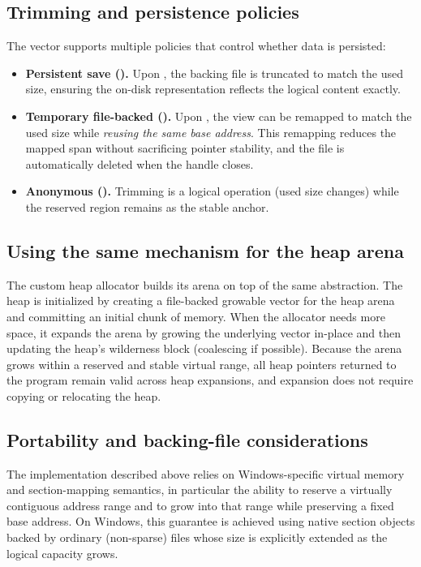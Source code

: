 \subsection{Trimming and persistence policies}
\label{sec:trim_persist}

The vector supports multiple policies that control whether data is persisted:
\begin{itemize}
  \item \textbf{Persistent save ().} Upon ,
  the backing file is truncated to match the used size, ensuring the on-disk
  representation reflects the logical content exactly.
  \item \textbf{Temporary file-backed ().} Upon
  , the view can be remapped to match the used size while
  \emph{reusing the same base address}. This remapping reduces the mapped span without
  sacrificing pointer stability, and the file is automatically deleted when the
  handle closes.
  \item \textbf{Anonymous ().} Trimming is a logical operation
  (used size changes) while the reserved region remains as the stable anchor.
\end{itemize}

\subsection{Using the same mechanism for the heap arena}
\label{sec:heap_uses_growable_vector}

The custom heap allocator builds its arena on top of the same
 abstraction. The heap is initialized by
creating a file-backed growable vector for the heap arena and committing an
initial chunk of memory. When the allocator needs more space, it expands the
arena by growing the underlying vector in-place and then updating the heap's
wilderness block (coalescing if possible). Because the arena grows within a
reserved and stable virtual range, all heap pointers returned to the program
remain valid across heap expansions, and expansion does not require copying or
relocating the heap.

\subsection{Portability and backing-file considerations}
\label{sec:disk_backed_portability_notes}

The implementation described above relies on Windows-specific virtual memory and
section-mapping semantics, in particular the ability to reserve a virtually
contiguous address range and to grow into that range while preserving a fixed
base address. On Windows, this guarantee is achieved using native section objects backed by
ordinary (non-sparse) files whose size is explicitly extended as the logical
capacity grows.

